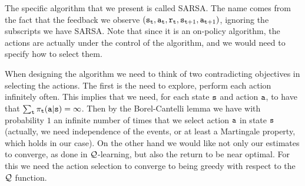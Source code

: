 The specific algorithm that we present is called SARSA. The name
comes from the fact that the feedback we observe
$({\tt s}_{\tt t},{\tt a}_{\tt t},{\tt r}_{\tt t},{\tt s}_{{\tt t}+1},{\tt a}_{{\tt t}+1})$,
ignoring the subscripts we have SARSA. Note that since it is an
on-policy algorithm, the actions are actually under the control of
the algorithm, and we would need to specify how to select them.

When designing the algorithm we need to think of two contradicting
objectives in selecting the actions. The first is the need to
explore, perform each action infinitely often. This implies that we
need, for each state ${\tt s}$ and action ${\tt a}$, to have that $\sum_{\tt t}
\pi_{\tt t}({\tt a}|{\tt s})=\infty$. Then by the Borel-Cantelli
lemma we have with probability $1$ an infinite number of times that
we select action ${\tt a}$ in state ${\tt s}$ (actually, we need
independence of the events, or at least a Martingale property, which
holds in our case). On the other hand we would like not only our
estimates to converge, as done in $\mathcal{Q}$-learning, but also the return
to be near optimal. For this we need the action selection to
converge to being greedy with respect to the $\mathcal{Q}$ function.








